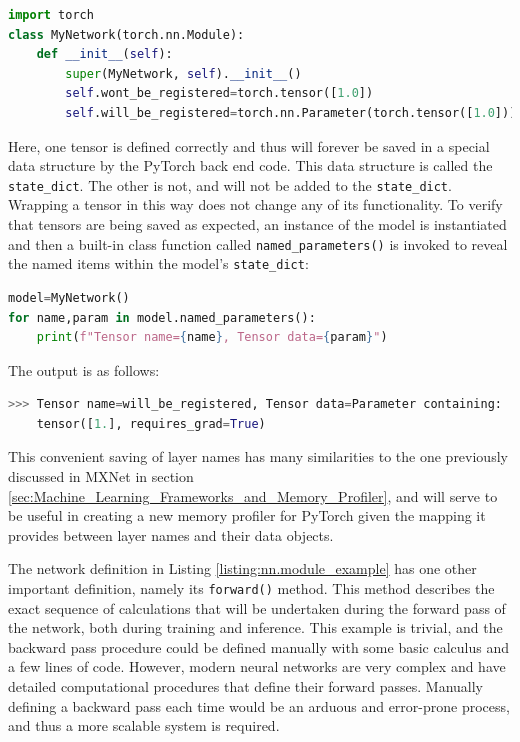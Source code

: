 \documentclass[12pt,letterpaper]{article}
\begin{document}
\begin{lstlisting}[language=Python]
import torch
class MyNetwork(torch.nn.Module):
    def __init__(self):
        super(MyNetwork, self).__init__()
        self.wont_be_registered=torch.tensor([1.0])
        self.will_be_registered=torch.nn.Parameter(torch.tensor([1.0]))
\end{lstlisting}
Here, one tensor is defined correctly and thus will forever be saved in a special data structure by the PyTorch back end code. This data structure is called the \texttt{state\_dict}. The other is not, and will not be added to the \texttt{state\_dict}. Wrapping a tensor in this way does not change any of its functionality. To verify that tensors are being saved as expected, an instance of the model is instantiated and then a built-in class function called \texttt{named\_parameters()} is invoked to reveal the named items within the model's \texttt{state\_dict}:
\begin{lstlisting}[language=Python]
model=MyNetwork()
for name,param in model.named_parameters():
    print(f"Tensor name={name}, Tensor data={param}")
\end{lstlisting}
The output is as follows:
\begin{lstlisting}[language=Python]
>>> Tensor name=will_be_registered, Tensor data=Parameter containing:
    tensor([1.], requires_grad=True)
\end{lstlisting}
\par
This convenient saving of layer names has many similarities to the one previously discussed in MXNet in section \ref{sec:Machine_Learning_Frameworks_and_Memory_Profiler}, and will serve to be useful in creating a new memory profiler for PyTorch given the mapping it provides between layer names and their data objects. 

%
%

\label{dynamic_computational_graphs_and_autograd}
The network definition in Listing \ref{listing:nn.module_example} has one other important definition, namely its \texttt{forward()} method. This method describes the exact sequence of calculations that will be undertaken during the forward pass of the network, both during training and inference. This example is trivial, and the backward pass procedure could be defined manually with some basic calculus and a few lines of code. However, modern neural networks are very complex and have detailed computational procedures that define their forward passes. Manually defining a backward pass each time would be an arduous and error-prone process, and thus a more scalable system is required.
\par
\end{document}
